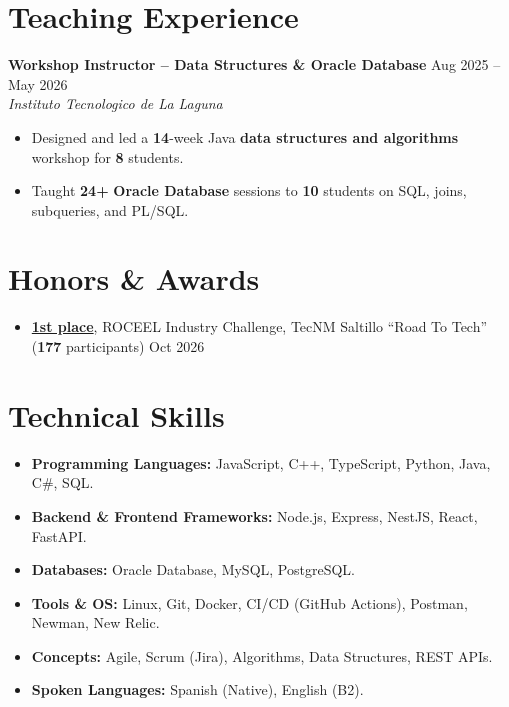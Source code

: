 \documentclass[letterpaper,11pt]{article}
\begin{document}
\section{\textbf{Teaching Experience}}
\textbf{Workshop Instructor -- Data Structures \& Oracle Database} \hfill Aug 2025 -- May 2026 \\
\textit{Instituto Tecnologico de La Laguna}
\begin{itemize}
    \item Designed and led a \textbf{14}-week Java \textbf{data structures and algorithms} workshop for \textbf{8} students.
    \item Taught \textbf{24+} \textbf{Oracle Database} sessions to \textbf{10} students on SQL, joins, subqueries, and PL/SQL.
\end{itemize}
\section{\textbf{Honors \& Awards}}
\begin{itemize}
    \item \textbf{\href{https://devpost.com/software/inventario-inteligente-noobs404}{1st place}}, ROCEEL Industry Challenge, TecNM Saltillo ``Road To Tech'' (\textbf{177} participants) \hfill Oct 2026
\end{itemize}
\section{\textbf{Technical Skills}}
\begin{itemize}
  \item \textbf{Programming Languages:} JavaScript, C++, TypeScript, Python, Java, C\#, SQL.
  \item \textbf{Backend \& Frontend Frameworks:} Node.js, Express, NestJS, React, FastAPI.
   \item \textbf{Databases:} Oracle Database, MySQL, PostgreSQL.
    \item \textbf{Tools \& OS:} Linux, Git, Docker, CI/CD (GitHub Actions), Postman, Newman, New Relic.
    \item \textbf{Concepts:} Agile, Scrum (Jira), Algorithms, Data Structures, REST APIs.
    \item \textbf{Spoken Languages:} Spanish (Native), English (B2).
\end{itemize}
\end{document}
